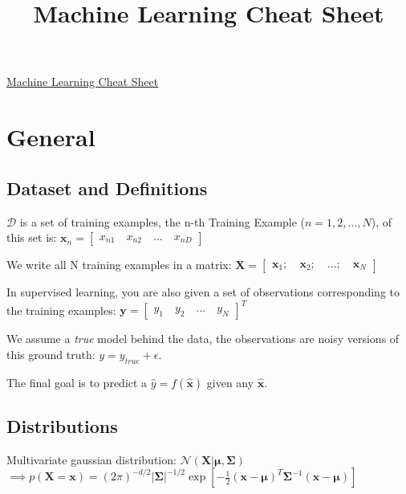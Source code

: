 \documentclass[10pt,a4paper,landscape]{article}
\renewcommand{\bf}[1]{\ensuremath{\mathbf{#1}}}
\begin{document}
\title{Machine Learning Cheat Sheet}

\raggedright
\footnotesize
\sffamily
\begin{multicols*}{4}

\setlength{\premulticols}{1pt}
\setlength{\postmulticols}{1pt}
\setlength{\multicolsep}{1pt}
\setlength{\columnsep}{2pt}

\begin{center}
\Large{\underline{Machine Learning Cheat Sheet}}
\end{center}

\section{General}
\subsection{Dataset and Definitions}
$\mathcal{D}$ is a set of training examples, the n-th Training Example ($n = 1,2, ..., N$), of this set is: $\bf{x}_n = \begin{bmatrix} x_{n1} \quad x_{n2} \quad ... \quad x_{nD} \end{bmatrix}$

We write all N training examples in a matrix: $\bf{X} = \begin{bmatrix} \bf{x}_1 ; \quad \bf{x}_2 ; \quad ... ; \quad \bf{x}_N \end{bmatrix}$

In supervised learning, you are also given a set of observations corresponding to the training examples:  $\bf{y} = \begin{bmatrix} y_1 \quad y_2 \quad ... \quad y_{N} \end{bmatrix}^T$

We assume a \emph{true} model behind the data, the observations are noisy versions of this ground truth: $y = y_{true} + \epsilon$.

The final goal is to predict a $\hat{y} = f(\bf{\hat{x}})$ given any $\bf{\hat{x}}$.

\subsection{Distributions}
Multivariate gaussian distribution: $\mathcal{N}(\bf{X} | \bf{\mu} , \bf{\Sigma})$ \\
$\implies p(\bf{X} = \bf{x}) = (2 \pi)^{-d/2} |\bf{\Sigma|}^{-1/2} \exp{[- \frac{1}{2} (\bf{x} - \bf{\mu})^T \bf{\Sigma}^{-1} (\bf{x} - \bf{\mu})]}$


\end{multicols*}
\end{document}
